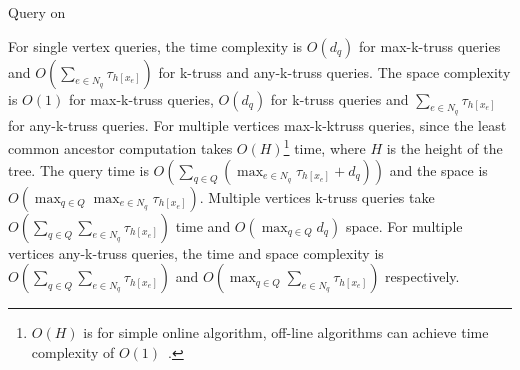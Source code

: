 \begin{algorithm}
	\BlankLine
	\BlankLine
	\BlankLine
	\caption{Query on \Treeindex{}}\label{alg:\treeindex{}_query}
\end{algorithm}

For single vertex queries, the time complexity is $O(d_q)$ for max-k-truss queries and $O(\sum_{e \in N_q}\tau_{h[x_e]})$ for k-truss and any-k-truss queries. The space complexity is $O(1)$ for max-k-truss queries, $O(d_q)$ for k-truss queries and $\sum_{e \in N_q}\tau_{h[x_e]}$ for any-k-truss queries. For multiple vertices max-k-ktruss queries, since the least common ancestor computation takes $O(H)$\footnote{$O(H)$ is for simple online algorithm, off-line algorithms can achieve time complexity of $O(1)$~\cite{bender2000lca}.} time, where $H$ is the height of the tree. The query time is $O(\sum_{q \in Q}(\max_{e \in N_q}\tau_{h[x_e]} + d_q))$ and the space is $O(\max_{q \in Q}\max_{e \in N_q}\tau_{h[x_e]})$. Multiple vertices k-truss queries take $O(\sum_{q \in Q}\sum_{e \in N_q}\tau_{h[x_e]})$ time and $O(\max_{q \in Q}d_q)$ space. For multiple vertices any-k-truss queries, the time and space complexity is $O(\sum_{q \in Q}\sum_{e \in N_q}\tau_{h[x_e]})$ and $O(\max_{q \in Q}\sum_{e \in N_q}\tau_{h[x_e]})$ respectively.


